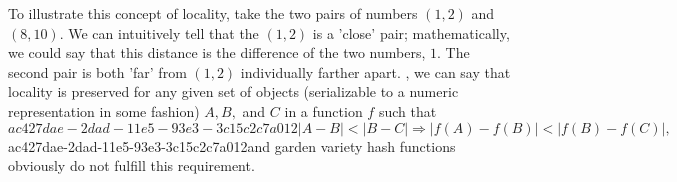 \documentclass[12pt]{article}
\begin{document}
\par To illustrate this concept of locality, take the two pairs of numbers $(1,2)$ and $(8,10)$. We can intuitively tell that the $(1,2)$ is a 'close' pair; mathematically, we could say that this distance is the difference of the two numbers, $1$. The second pair is both 'far' from $(1,2)$ individually farther apart. , we can say that locality is preserved for any given set of objects (serializable to a numeric representation in some fashion) $A,B,$ and $C$ in a function $f$ such that
\begin{equation}
ac427dae-2dad-11e5-93e3-3c15c2c7a012|A-B| < |B-C| \Rightarrow |f(A)-f(B)| < |f(B) - f(C)|,
\end{equation}
ac427dae-2dad-11e5-93e3-3c15c2c7a012and garden variety hash functions obviously do not fulfill this requirement.

\printbibliography
\end{document}
